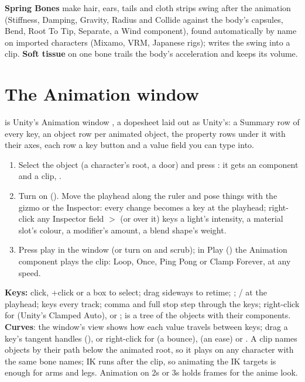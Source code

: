\textbf{Spring Bones} make hair, ears, tails and cloth strips swing after the animation (Stiffness, Damping, Gravity,
Radius and Collide against the body's capsules, Bend, Root To Tip, Separate, a Wind component), found automatically by
name on imported characters (Mixamo, VRM, Japanese rigs);  writes the swing into a clip. \textbf{Soft tissue}
on one bone trails the body's acceleration and keeps its volume.

\section{The Animation window}
 is Unity's Animation window \cite{UnityManual2026}, a dopesheet laid out as Unity's: a
Summary row of every key, an object row per animated object, the property rows under it with their axes, each row a key
button and a value field you can type into.
\begin{enumerate}
  \item Select the object (a character's root, a door) and press : it gets an  component and a
    clip, .
  \item Turn on  (). Move the playhead along the ruler and pose things with the gizmo or the
    Inspector: every change becomes a key at the playhead; right-click any Inspector field $>$ 
    (or  over it) keys a light's intensity, a material slot's colour, a modifier's amount, a blend shape's weight.
  \item Press play in the window (or turn on  and scrub); in Play () the Animation component
    plays the clip: Loop, Once, Ping Pong or Clamp Forever, at any speed.
\end{enumerate}
\textbf{Keys:} click, +click or a box to select; drag sideways to retime; ;  /
 at the playhead;  keys every track; comma and full stop step through the keys; right-click for
 (Unity's Clamped Auto),  or ;  is a tree of the objects with their
components. \textbf{Curves}: the window's  view shows how each value travels between keys; drag a key's
tangent handles (), or right-click for  (a bounce),  (an ease) or .
A clip names objects by their path below the animated root, so it plays on any character with the same bone names;
IK runs after the clip, so animating the IK targets is enough for arms and legs. Animation on 2s or 3s holds frames
for the anime look.

